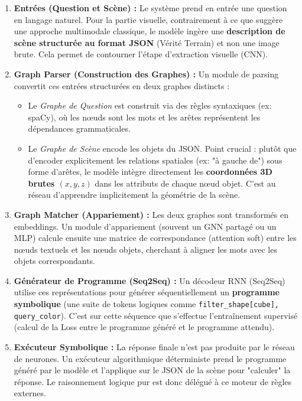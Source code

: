 \documentclass[a4paper,11pt]{article}
\begin{document}
\begin{enumerate}
    \item \textbf{Entrées (Question et Scène) :} 
    Le système prend en entrée une question en langage naturel. Pour la partie visuelle, contrairement à ce que suggère une approche multimodale classique, le modèle ingère une \textbf{description de scène structurée au format JSON} (Vérité Terrain) et non une image brute. Cela permet de contourner l'étape d'extraction visuelle (CNN).

    \item \textbf{Graph Parser (Construction des Graphes) :} 
    Un module de parsing convertit ces entrées structurées en deux graphes distincts :
    \begin{itemize}
        \item Le \textit{Graphe de Question} est construit via des règles syntaxiques (ex: spaCy), où les nœuds sont les mots et les arêtes représentent les dépendances grammaticales.
        \item Le \textit{Graphe de Scène} encode les objets du JSON. Point crucial : plutôt que d'encoder explicitement les relations spatiales (ex: "à gauche de") sous forme d'arêtes, le modèle intègre directement les \textbf{coordonnées 3D brutes $(x, y, z)$} dans les attributs de chaque nœud objet. C'est au réseau d'apprendre implicitement la géométrie de la scène.
    \end{itemize}

    \item \textbf{Graph Matcher (Appariement) :} 
    Les deux graphes sont transformés en embeddings. Un module d'appariement (souvent un GNN partagé ou un MLP) calcule ensuite une matrice de correspondance (attention soft) entre les nœuds textuels et les nœuds objets, cherchant à aligner les mots avec les objets correspondants.

    \item \textbf{Générateur de Programme (Seq2Seq) :} 
    Un décodeur RNN (Seq2Seq) utilise ces représentations pour générer séquentiellement un \textbf{programme symbolique} (une suite de tokens logiques comme \texttt{filter\_shape[cube], query\_color}). C'est sur cette séquence que s'effectue l'entraînement supervisé (calcul de la Loss entre le programme généré et le programme attendu).

    \item \textbf{Exécuteur Symbolique :} 
    La réponse finale n'est pas produite par le réseau de neurones. Un exécuteur algorithmique déterministe prend le programme généré par le modèle et l'applique sur le JSON de la scène pour "calculer" la réponse. Le raisonnement logique pur est donc délégué à ce moteur de règles externes.
\end{enumerate}
\end{document}

